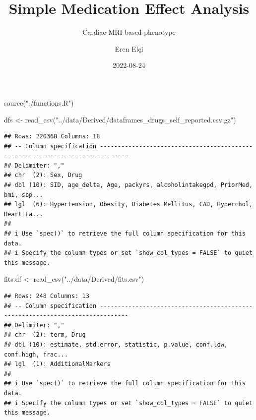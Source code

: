 \documentclass[
]{article}
\title{Simple Medication Effect Analysis}
\subtitle{Cardiac-MRI-based phenotype}
\author{Eren Elçi}
\date{2022-08-24}
\newenvironment{Shaded}{\begin{snugshade}}{\end{snugshade}}
\newcommand{\FunctionTok}[1]{\textcolor[rgb]{0.00,0.00,0.00}{#1}}
\newcommand{\NormalTok}[1]{#1}
\newcommand{\OtherTok}[1]{\textcolor[rgb]{0.56,0.35,0.01}{#1}}
\newcommand{\StringTok}[1]{\textcolor[rgb]{0.31,0.60,0.02}{#1}}
\begin{document}
\maketitle

\begin{Shaded}
\begin{Highlighting}[]
\FunctionTok{source}\NormalTok{(}\StringTok{"./functions.R"}\NormalTok{)}
\end{Highlighting}
\end{Shaded}

\begin{Shaded}
\begin{Highlighting}[]
\NormalTok{dfs }\OtherTok{\textless{}{-}} \FunctionTok{read\_csv}\NormalTok{(}\StringTok{"../data/Derived/dataframes\_drugs\_self\_reported.csv.gz"}\NormalTok{)}
\end{Highlighting}
\end{Shaded}

\begin{verbatim}
## Rows: 220368 Columns: 18
## -- Column specification ------------------------------------------------------------------------------
## Delimiter: ","
## chr  (2): Sex, Drug
## dbl (10): SID, age_delta, Age, packyrs, alcoholintakegpd, PriorMed, bmi, sbp...
## lgl  (6): Hypertension, Obesity, Diabetes Mellitus, CAD, Hyperchol, Heart Fa...
## 
## i Use `spec()` to retrieve the full column specification for this data.
## i Specify the column types or set `show_col_types = FALSE` to quiet this message.
\end{verbatim}

\begin{Shaded}
\begin{Highlighting}[]
\NormalTok{fits.df }\OtherTok{\textless{}{-}} \FunctionTok{read\_csv}\NormalTok{(}\StringTok{"../data/Derived/fits.csv"}\NormalTok{)}
\end{Highlighting}
\end{Shaded}

\begin{verbatim}
## Rows: 248 Columns: 13
## -- Column specification ------------------------------------------------------------------------------
## Delimiter: ","
## chr  (2): term, Drug
## dbl (10): estimate, std.error, statistic, p.value, conf.low, conf.high, frac...
## lgl  (1): AdditionalMarkers
## 
## i Use `spec()` to retrieve the full column specification for this data.
## i Specify the column types or set `show_col_types = FALSE` to quiet this message.
\end{verbatim}
\end{document}
